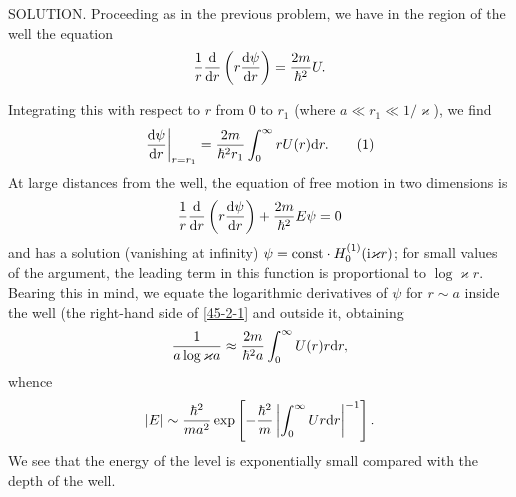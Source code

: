 {SOLUTION. Proceeding as in the previous problem, we have in the region of the well the equation
\[ \frac{1}{r}\frac{\mathrm{d}}{\mathrm{d} r}\left(r\frac{\mathrm{d}\psi}{\mathrm{d} r} \right)=\frac{2m}{\hbar^2}U. \]



Integrating this with respect to $ r $ from $ 0 $ to $ r_1 $ (where $ a\ll r_1\ll 1/\varkappa $), we find
\begin{equation}\label{45-2-1}
\left.\frac{\mathrm{d}\psi}{\mathrm{d} r}\right|_{r=r_1}=\frac{2m}{\hbar^2 r_1}\int_{0}^{\infty}rU(r)\mathrm{d} r.\tag{1}
\end{equation}
At large distances from the well, the equation of free motion in two dimensions is
\[ \frac{1}{r}\frac{\mathrm{d}}{\mathrm{d} r}\left(r\frac{\mathrm{d}\psi}{\mathrm{d} r} \right)+\frac{2m}{\hbar^2}E\psi=0 \]
and has a solution (vanishing at infinity) $ \psi =\mathrm{const}\cdot H_0^{(1)}(\mathrm{i}\varkappa r) $; for small values of the argument, the leading term in this function is proportional to $ \log \varkappa r $. Bearing this in mind, we equate the logarithmic derivatives of $ \psi $ for $ r \sim a $ inside the well (the right-hand side of \eqref{45-2-1} and outside it, obtaining
\[ \frac{1}{a\log\varkappa a}\approx\frac{2m}{\hbar^2 a}\int_0^\infty U(r)r\mathrm{d} r, \]
whence
\[ |E|\sim\frac{\hbar^2}{ma^2}\exp\left[-\frac{\hbar^2}{m}\left|\int_0^\infty Ur\mathrm{d} r \right|^{-1} \right]. \]
We see that the energy of the level is exponentially small compared with the depth of the well.}
